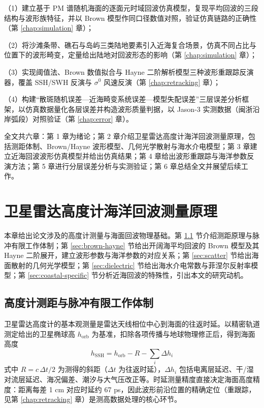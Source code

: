 \documentclass[a4paper]{article}
\newcommand{\sectionbreak}{\clearpage} %
\begin{document}
（1）建立基于 PM 谱随机海面的逐面元时域回波仿真模型，复现平均回波的三段结构与波形族特征，并以 Brown 模型作同口径数值对照，验证仿真链路的正确性（第 \ref{chap:simulation} 章）；

（2）将沙滩条带、礁石与岛屿三类陆地要素引入近海复合场景，仿真不同占比与位置下的波形畸变，定量给出陆地对回波形态的影响（第 \ref{chap:simulation} 章）；

（3）实现阈值法、Brown 数值拟合与 Hayne 二阶解析模型三种波形重跟踪反演器，覆盖 SSH/SWH 反演与 $\sigma^0$ 风速反演（第 \ref{chap:retracking} 章）；

（4）构建“散斑随机误差—近海畸变系统误差—模型失配误差”三层误差分析框架，以仿真数据量化各层误差并构造波形质量判据，以 Jason-3 实测数据（闽浙沿岸弧段）对照验证（第 \ref{chap:error} 章）。

全文共六章：第 1 章为绪论；第 2 章介绍卫星雷达高度计海洋回波测量原理，包括测距体制、Brown/Hayne 波形模型、几何光学散射与海水介电模型；第 3 章建立近海回波波形仿真模型并给出仿真结果；第 4 章给出波形重跟踪与海洋参数反演方法；第 5 章进行分层误差分析与实测验证；第 6 章总结全文并展望后续工作。

\sectionbreak

\section{卫星雷达高度计海洋回波测量原理}
\label{chap:principle}

本章给出论文涉及的高度计测量与海面回波物理基础。第 \ref{sec:altimeter-principle} 节介绍测距原理与脉冲有限工作体制；第 \ref{sec:brown-hayne} 节给出开阔海平均回波的 Brown 模型及其 Hayne 二阶展开，建立波形参数与海洋参数的对应关系；第 \ref{sec:scatter} 节给出海面散射的几何光学模型；第 \ref{sec:dielectric} 节给出海水介电常数与菲涅尔反射率模型；第 \ref{sec:coastal-specific} 节分析近海回波的特殊性，引出本文的研究动机。

\subsection{高度计测距与脉冲有限工作体制}
\label{sec:altimeter-principle}

卫星雷达高度计的基本观测量是雷达天线相位中心到海面的往返时延。以精密轨道测定给出的卫星椭球高 $h_{\mathrm{orb}}$ 为基准，扣除各项传播与地球物理修正后，得到海面高度
\begin{equation}
	h_{\mathrm{SSH}} = h_{\mathrm{orb}} - R - \sum_i \Delta h_i
	\label{eq:ssh}
\end{equation}
式中 $R = c\, \Delta t / 2$ 为测得的斜距（$\Delta t$ 为往返时延），$\Delta h_i$ 包括电离层延迟、干/湿对流层延迟、海况偏差、潮汐与大气压改正等\cite{chelton2001}。时延测量精度直接决定海面高度精度：距离每差 1 cm 对应时延约 67 ps，因此波形前沿位置的精确定位（重跟踪，见第 \ref{chap:retracking} 章）是测高数据处理的核心环节。
\end{document}
